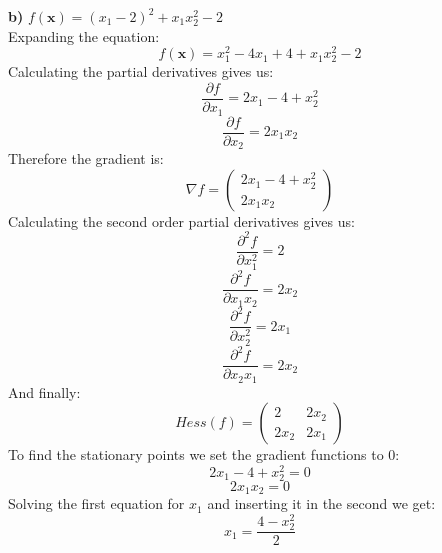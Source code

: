 \documentclass{article}
\begin{document}
\textbf{b)} $f(\boldsymbol{x}) = (x_1 - 2)^2 + x_1x_2^2 - 2$\\
Expanding the equation:
\begin{equation*}
    f(\boldsymbol{x}) = x_1^2 - 4x_1 + 4 + x_1x_2^2 - 2
\end{equation*}
Calculating the partial derivatives gives us:
\begin{equation*}
    \frac{\partial f}{\partial x_1} = 2x_1 - 4 + x_2^2
\end{equation*}
\begin{equation*}
    \frac{\partial f}{\partial x_2} = 2x_1x_2
\end{equation*}
Therefore the gradient is:
\begin{equation*}
    \nabla f = \begin{pmatrix} 2x_1 - 4 + x_2^2\\ 2x_1x_2\end{pmatrix}
\end{equation*}
Calculating the second order partial derivatives gives us:
\begin{equation*}
    \frac{\partial ^2 f}{\partial x_1^2} = 2
\end{equation*}
\begin{equation*}
    \frac{\partial ^2 f}{\partial x_1x_2} = 2x_2
\end{equation*}
\begin{equation*}
    \frac{\partial ^2 f}{\partial x_2^2} = 2x_1
\end{equation*}
\begin{equation*}
    \frac{\partial ^2 f}{\partial x_2x_1} = 2x_2
\end{equation*}
And finally:
\begin{equation}
\label{1b_hess}
    Hess(f) = \begin{pmatrix} 2 & 2x_2 \\ 2x_2 & 2x_1 \end{pmatrix}
\end{equation}
To find the stationary points we set the gradient functions to 0:
\begin{equation*}
    2x_1 - 4 + x_2^2 = 0
\end{equation*}
\begin{equation*}
    2x_1x_2 = 0
\end{equation*}
Solving the first equation for $x_1$ and inserting it in the second we get:
\begin{equation}
\label{1b_for_x1}
    x_1 = \frac{4-x_2^2}{2}
\end{equation}
\end{document}
